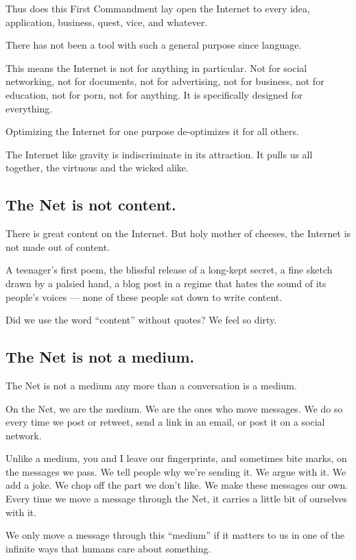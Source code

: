 \documentclass[letterpaper,12pt,english]{sphinxmanual}
\begin{document}
Thus does this First Commandment lay open the Internet to every idea, application, business, quest, vice, and whatever.

There has not been a tool with such a general purpose since language.

This means the Internet is not for anything in particular. Not for social networking, not for documents, not for advertising, not for business, not for education, not for porn, not for anything. It is specifically designed for everything.

Optimizing the Internet for one purpose de-optimizes it for all others.

The Internet like gravity is indiscriminate in its attraction. It pulls us all together, the virtuous and the wicked alike.


\subsection{The Net is not content.}
\label{2015newclues:the-net-is-not-content}
There is great content on the Internet. But holy mother of cheeses, the Internet is not made out of content.

A teenager's first poem, the blissful release of a long-kept secret, a fine sketch drawn by a palsied hand, a blog post in a regime that hates the sound of its people's voices — none of these people sat down to write content.

Did we use the word ``content'' without quotes? We feel so dirty.


\subsection{The Net is not a medium.}
\label{2015newclues:the-net-is-not-a-medium}
The Net is not a medium any more than a conversation is a medium.

On the Net, we are the medium. We are the ones who move messages. We do so every time we post or retweet, send a link in an email, or post it on a social network.

Unlike a medium, you and I leave our fingerprints, and sometimes bite marks, on the messages we pass. We tell people why we're sending it. We argue with it. We add a joke. We chop off the part we don't like. We make these messages our own.
Every time we move a message through the Net, it carries a little bit of ourselves with it.

We only move a message through this ``medium'' if it matters to us in one of the infinite ways that humans care about something.
\end{document}
